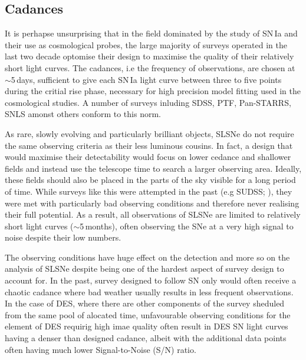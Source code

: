 \subsection{Cadances}
It is perhapse unsurprising that in the field dominated by the study of SN\,Ia and their use as cosmological probes, the large majority of surveys operated in the last two decade optomise their design to maximise the quality of their relatively short light curves. The cadances, i.e the frequency of observations, are chosen at $\sim$5\,days, sufficient to give each SN\,Ia light curve between three to five points during the critial rise phase, necessary for high precision model fitting used in the cosmological studies. A number of surveys inluding SDSS, PTF, Pan-STARRS, SNLS amonst others conform to this norm.

As rare, slowly evolving and particularly brilliant objects, SLSNe do not require the same observing criteria as their less luminous cousins. In fact, a design that would maximise their detectability would focus on lower cedance and shallower fields and instead use the telescope time to search a larger observing area. Ideally, these fields should also be placed in the parts of the sky visible for a long period of time. While surveys like this were attempted in the past (e.g SUDSS; ), they were met with particularly bad observing conditions and therefore never realising their full potential. As a result, all observations of SLSNe are limited to relatively short light curves ($\sim$5\,months), often observing the SNe at a very high signal to noise despite their low numbers.

The observing conditions have huge effect on the detection and more so on the analysis of SLSNe despite being one of the hardest aspect of survey design to account for. In the past, survey designed to follow SN only would often receive a chaotic cadance where bad weather usually results in less frequent observations. In the case of DES, where there are other components of the survey sheduled from the same pool of alocated time, unfavourable observing conditions for the element of DES requirig high imae quality often result in DES SN light curves having a denser than designed cadance, albeit with the additional data points often having much lower Signal-to-Noise (S/N) ratio.

